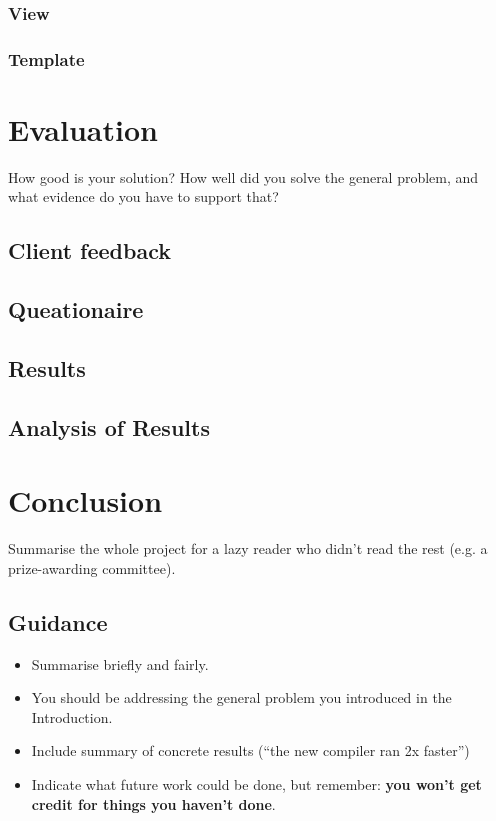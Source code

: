 \documentclass{l4proj}
\begin{document}
\subsection{View}

\subsection{Template}


\chapter{Evaluation} 
How good is your solution? How well did you solve the general problem, and what evidence do you have to support that?

\section{Client feedback}

\section{Queationaire}

\section{Results}

\section{Analysis of Results}


\chapter{Conclusion}    
Summarise the whole project for a lazy reader who didn't read the rest (e.g. a prize-awarding committee).
\section{Guidance}
\begin{itemize}
    \item
        Summarise briefly and fairly.
    \item
        You should be addressing the general problem you introduced in the
        Introduction.        
    \item
        Include summary of concrete results (``the new compiler ran 2x
        faster'')
    \item
        Indicate what future work could be done, but remember: \textbf{you
        won't get credit for things you haven't done}.
\end{itemize}
\end{document}
